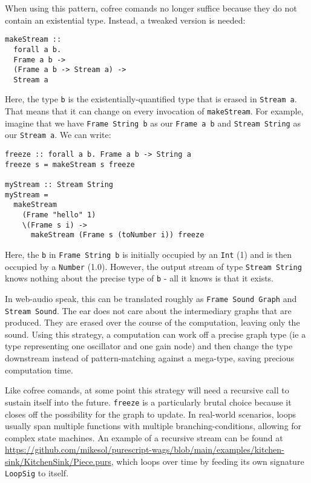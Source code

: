 \documentclass{sig-alternate}
\begin{document}
\begin{sloppypar}
  When using this pattern, cofree comands no longer suffice because they do not contain an existential type. Instead, a tweaked version is needed:

  \begin{verbatim}
makeStream ::
  forall a b.
  Frame a b ->
  (Frame a b -> Stream a) ->
  Stream a
  \end{verbatim}

  Here, the type \texttt{b} is the existentially-quantified type that is erased in \texttt{Stream a}. That means that it can change on every invocation of \texttt{makeStream}.  For example, imagine that we have \texttt{Frame String b} as our \texttt{Frame a b} and \texttt{Stream String} as our \texttt{Stream a}.  We can write:

  \begin{verbatim}
freeze :: forall a b. Frame a b -> String a
freeze s = makeStream s freeze

myStream :: Stream String
myStream =
  makeStream
    (Frame "hello" 1)
    \(Frame s i) ->
      makeStream (Frame s (toNumber i)) freeze
  \end{verbatim}
  
  Here, the \texttt{b} in \texttt{Frame String b} is initially occupied by an \texttt{Int} (1) and is then occupied by a \texttt{Number} (1.0). However, the output stream of type \texttt{Stream String} knows nothing about the precise type of \texttt{b} - all it knows is that it exists.
  
  In web-audio speak, this can be translated roughly as \texttt{Frame Sound Graph} and \texttt{Stream Sound}. The ear does not care about the intermediary graphs that are produced. They are erased over the course of the computation, leaving only the sound. Using this strategy, a computation can work off a precise graph type (ie a type representing one oscillator and one gain node) and then change the type downstream instead of pattern-matching against a mega-type, saving precious computation time.

  Like cofree comands, at some point this strategy will need a recursive call to sustain itself into the future. \texttt{freeze} is a particularly brutal choice because it closes off the possibility for the graph to update. In real-world scenarios, loops usually span multiple functions with multiple branching-conditions, allowing for complex state machines. An example of a recursive stream can be found at \url{https://github.com/mikesol/purescript-wags/blob/main/examples/kitchen-sink/KitchenSink/Piece.purs}, which loops over time by feeding its own signature \texttt{LoopSig} to itself.


\end{sloppypar}
\end{document}

